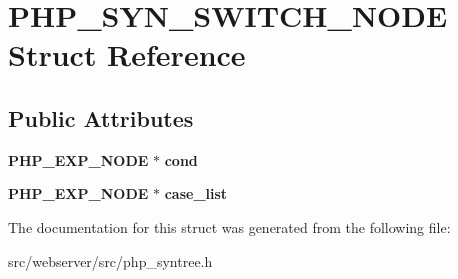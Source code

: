 \section{PHP\_\-SYN\_\-SWITCH\_\-NODE Struct Reference}
\label{structPHP__SYN__SWITCH__NODE}
\subsection*{Public Attributes}
\begin{DoxyCompactItemize}
\item 
{\bf PHP\_\-EXP\_\-NODE} $\ast$ {\bfseries cond}\label{structPHP__SYN__SWITCH__NODE_ac651a89b935a0b886d0c6c93d9784421}

\item 
{\bf PHP\_\-EXP\_\-NODE} $\ast$ {\bfseries case\_\-list}\label{structPHP__SYN__SWITCH__NODE_a22a3bf02210a437b8ed0fc515ee400bd}

\end{DoxyCompactItemize}


The documentation for this struct was generated from the following file:\begin{DoxyCompactItemize}
\item 
src/webserver/src/php\_\-syntree.h\end{DoxyCompactItemize}
